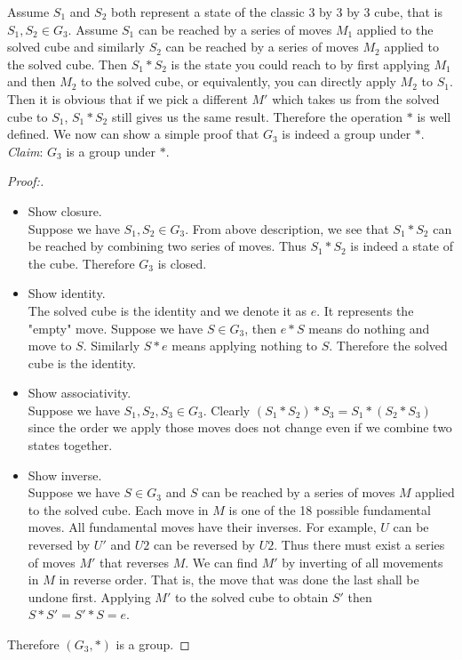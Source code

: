 \par Assume $S_1$ and $S_2$ both represent a state of the classic 3 by 3 by 3 cube, that is $S_1, S_2 \in G_3$. Assume $S_1$ can be reached by a series of moves $M_1$ applied to the solved cube and similarly $S_2$ can be reached by a series of moves $M_2$ applied to the solved cube. Then $S_1 * S_2$ is the state you could reach to by first applying $M_1$ and then $M_2$ to the solved cube, or equivalently, you can directly apply $M_2$ to $S_1$. Then it is obvious that if we pick a different $M'$ which takes us from the solved cube to $S_1$, $S_1 * S_2$ still gives us the same result. Therefore the operation $*$ is well defined. We now can show a simple proof that $G_3$ is indeed a group under $*$. \\
\textit{Claim}: $G_3$ is a group under $*$.
\begin{proof}[Proof:]\item
    \begin{itemize}
        \item Show closure. \\
        Suppose we have $S_1, S_2 \in G_3$. From above description, we see that $S_1 * S_2$ can be reached by combining two series of moves. Thus $S_1 * S_2$ is indeed a state of the cube. Therefore $G_3$ is closed.
        \item Show identity. \\
        The solved cube is the identity and we denote it as $e$. It represents the "empty" move. Suppose we have $S \in G_3$, then $e*S$ means do nothing and move to $S$. Similarly $S*e$ means applying nothing to $S$. Therefore the solved cube is the identity.
        \item Show associativity. \\
        Suppose we have $S_1, S_2, S_3 \in G_3$. Clearly $(S_1 * S_2) * S_3 = S_1 * (S_2 * S_3)$ since the order we apply those moves does not change even if we combine two states together. 
        \item Show inverse. \\
        Suppose we have $S \in G_3$ and $S$ can be reached by a series of moves $M$ applied to the solved cube. Each move in $M$ is one of the 18 possible fundamental moves. All fundamental moves have their inverses. For example, $U$ can be reversed by $U'$ and $U2$ can be reversed by $U2$. Thus there must exist a series of moves $M'$ that reverses $M$. We can find $M'$ by inverting of all movements in $M$ in reverse order. That is, the move that was done the last shall be undone first. Applying $M'$ to the solved cube to obtain $S'$ then $S*S' = S'*S = e$.
    \end{itemize}
    Therefore $(G_3, *)$ is a group.
\end{proof}

